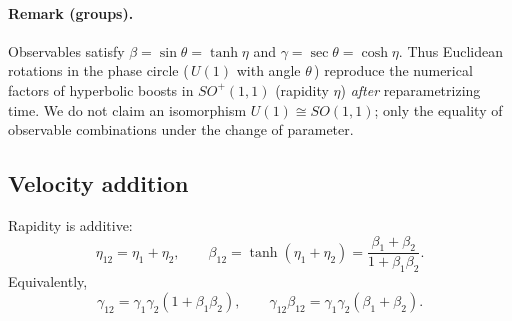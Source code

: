 \documentclass[11pt]{article}
\numberwithin{equation}{section}
\begin{document}
\paragraph{Remark (groups).} Observables satisfy $\beta=\sin\theta=\tanh\eta$ and $\gamma=\sec\theta=\cosh\eta$. Thus Euclidean rotations in the phase circle (\,$U(1)$ with angle $\theta$\,) reproduce the numerical factors of hyperbolic boosts in $SO^+(1,1)$ (rapidity $\eta$) \emph{after} reparametrizing time. We do not claim an isomorphism $U(1)\cong SO(1,1)$; only the equality of observable combinations under the change of parameter.

\subsection{Velocity addition}
Rapidity is additive:
\begin{equation}
\eta_{12}=\eta_1+\eta_2,\qquad
\beta_{12}=\tanh(\eta_1+\eta_2)=\frac{\beta_1+\beta_2}{1+\beta_1\beta_2}.
\label{eq:372}
\end{equation}
Equivalently,
\begin{equation}
\gamma_{12}=\gamma_1\gamma_2(1+\beta_1\beta_2),\qquad
\gamma_{12}\beta_{12}=\gamma_1\gamma_2(\beta_1+\beta_2).
\label{eq:374}
\end{equation}
\end{document}
